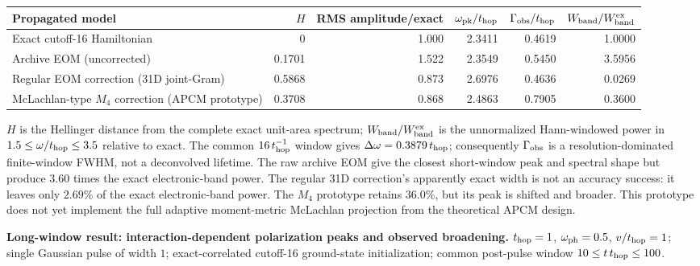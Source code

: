\documentclass[10pt]{article}
\begin{document}
\begin{center}
  \scriptsize
  \setlength{\tabcolsep}{3.5pt}
  \begin{tabular}{@{}lrrrrr@{}}
    \toprule
    Propagated model & $H$ & RMS amplitude/exact
      & $\omega_{\rm pk}/t_{\rm hop}$ & $\Gamma_{\rm obs}/t_{\rm hop}$
      & $W_{\rm band}/W_{\rm band}^{\rm ex}$ \\
    \midrule
    Exact cutoff-16 Hamiltonian & 0 & 1.000 & 2.3411 & 0.4619 & 1.0000 \\
    Archive EOM (uncorrected) & 0.1701 & 1.522 & 2.3549 & 0.5450 & 3.5956 \\
    Regular EOM correction (31D joint-Gram)
      & 0.5868 & 0.873 & 2.6976 & 0.4636 & 0.0269 \\
    McLachlan-type $M_4$ correction (APCM prototype)
      & 0.3708 & 0.868 & 2.4863 & 0.7905 & 0.3600 \\
    \bottomrule
  \end{tabular}
\end{center}
\vspace{-4pt}
{\footnotesize\noindent
$H$ is the Hellinger distance from the complete exact unit-area spectrum;
$W_{\rm band}/W_{\rm band}^{\rm ex}$ is the unnormalized Hann-windowed
power in $1.5\le\omega/t_{\rm hop}\le3.5$ relative to exact.
The common $16\,t_{\rm hop}^{-1}$ window gives
$\Delta\omega=0.3879\,t_{\rm hop}$; consequently
$\Gamma_{\rm obs}$ is a resolution-dominated finite-window FWHM, not a
deconvolved lifetime.  The raw archive EOM give the closest short-window peak
and spectral shape but produce $3.60$ times the exact electronic-band power.
The regular 31D correction's apparently exact width is not an accuracy
success: it leaves only $2.69\%$ of the exact electronic-band power.  The
$M_4$ prototype retains $36.0\%$, but its peak is shifted and broader. This prototype does
not yet implement the full adaptive moment-metric McLachlan projection from
the theoretical APCM design.\par}

\clearpage

\begin{center}
\small
\textbf{Long-window result: interaction-dependent polarization peaks and observed broadening.}
$t_{\rm hop}=1$, $\omega_{\rm ph}=0.5$, $v/t_{\rm hop}=1$;
single Gaussian pulse of width $1$; exact-correlated cutoff-16 ground-state
initialization; common post-pulse window $10\le t\,t_{\rm hop}\le100$.
\end{center}
\end{document}
